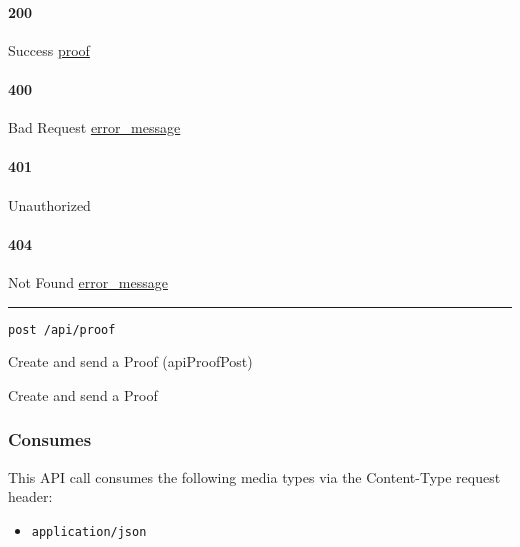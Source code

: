 \hypertarget{section-321}{%
\paragraph{200}\label{section-321}}

Success \protect\hyperlink{proof}{proof}

\hypertarget{section-322}{%
\paragraph{400}\label{section-322}}

Bad Request \protect\hyperlink{error_message}{error\_message}

\hypertarget{section-323}{%
\paragraph{401}\label{section-323}}

Unauthorized \protect\hyperlink{}{}

\hypertarget{section-324}{%
\paragraph{404}\label{section-324}}

Not Found \protect\hyperlink{error_message}{error\_message}

\begin{center}\rule{0.5\linewidth}{\linethickness}\end{center}

\protect\hypertarget{apiProofPost}{}{}

\begin{verbatim}
post /api/proof
\end{verbatim}

Create and send a Proof ({apiProofPost})

Create and send a Proof

\hypertarget{consumes-32}{%
\subsubsection{Consumes}\label{consumes-32}}

This API call consumes the following media types via the {Content-Type}
request header:

\begin{itemize}
\tightlist
\item
  \texttt{application/json}
\end{itemize}

